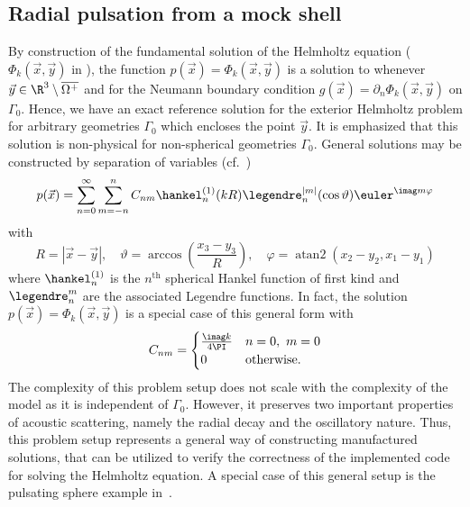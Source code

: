 \subsection{Radial pulsation from a mock shell}
\label{Subsec2:mockShell}
By construction of the fundamental solution of the Helmholtz equation ($\Phi_k(\vec{x},\vec{y})$ in ), the function $p(\vec{x}) = \Phi_k(\vec{x},\vec{y})$ is a solution to  whenever $\vec{y}\in\R^3\setminus\overline{\Omega^+}$ and for the Neumann boundary condition $g(\vec{x})=\partial_n\Phi_k(\vec{x},\vec{y})$ on $\Gamma_0$.  Hence, we have an exact reference solution for the exterior Helmholtz problem for arbitrary geometries $\Gamma_0$ which encloses the point $\vec{y}$. It is emphasized that this solution is non-physical for non-spherical geometries $\Gamma_0$. General solutions may be constructed by separation of variables (cf.~\cite[p. 26]{Ihlenburg1998fea})
\begin{equation}
	p(\vec{x}) = \sum_{n=0}^\infty\sum_{m=-n}^n C_{nm} \hankel_n^{(1)}(kR) \legendre_n^{|m|}(\cos\vartheta)\euler^{\imag m\varphi} 
\end{equation}
with
\begin{equation*}
	R = |\vec{x}-\vec{y}|,\quad \vartheta=\arccos\left(\frac{x_3-y_3}{R}\right),\quad\varphi = \operatorname{atan2}(x_2-y_2,x_1-y_1)
\end{equation*}
where $\hankel_n^{(1)}$ is the $n^{\mathrm{th}}$ spherical Hankel function of first kind and $\legendre_n^m$ are the associated Legendre functions. In fact, the solution $p(\vec{x}) = \Phi_k(\vec{x},\vec{y})$ is a special case of this general form with 
\begin{equation}
	C_{nm} = \begin{cases}
		\frac{\imag k}{4\PI} & n = 0,\,\,m=0\\
		0 & \text{otherwise}.
		\end{cases}
\end{equation}
The complexity of this problem setup does not scale with the complexity of the model as it is independent of $\Gamma_0$. However, it preserves two important properties of acoustic scattering, namely the radial decay and the oscillatory nature. Thus, this problem setup represents a general way of constructing manufactured solutions, that can be utilized to verify the correctness of the implemented code for solving the Helmholtz equation. A special case of this general setup is the pulsating sphere example in~\cite{Simpson2014aib}.

